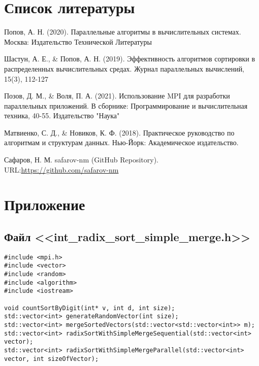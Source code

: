 \documentclass[a4paper, 14pt]{article}
\theoremstyle{plain}
\begin{document}
\newpage
\section*{\centering Список литературы}
\begin{enumerate}[label={[\arabic*]}]
	\item Попов, А. Н. (2020). Параллельные алгоритмы в вычислительных системах. Москва: Издательство Технической Литературы
	\item Шастун, А. Е., \& Попов, А. Н. (2019). Эффективность алгоритмов сортировки в распределенных вычислительных средах. Журнал параллельных вычислений, 15(3), 112-127
	\item Позов, Д. М., \& Воля, П. А. (2021). Использование MPI для разработки параллельных приложений. В сборнике: Программирование и вычислительная техника, 40-55. Издательство "Наука"
	\item Матвиенко, С. Д., \& Новиков, К. Ф. (2018). Практическое руководство по алгоритмам и структурам данных. Нью-Йорк: Академическое издательство.
	\item Сафаров, Н. М. safarov-nm (GitHub Repository). URL:\href{https://github.com/safarov-nm}{https://github.com/safarov-nm}
\end{enumerate}

\newpage
\section*{\centering Приложение}
\subsection*{\centering Файл <<int\_radix\_sort\_simple\_merge.h>>}
\begin{verbatim}
#include <mpi.h>
#include <vector>
#include <random>
#include <algorithm>
#include <iostream>

void countSortByDigit(int* v, int d, int size);
std::vector<int> generateRandomVector(int size);
std::vector<int> mergeSortedVectors(std::vector<std::vector<int>> m);
std::vector<int> radixSortWithSimpleMergeSequential(std::vector<int> vector);
std::vector<int> radixSortWithSimpleMergeParallel(std::vector<int> vector, int sizeOfVector);
\end{verbatim}
\end{document}

